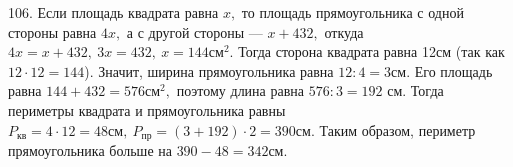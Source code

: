 106. Если площадь квадрата равна $x,$ то площадь прямоугольника с одной стороны равна $4x,$ а с другой стороны --- $x+432,$ откуда $4x=x+432,\ 3x=432,\ x=144\text{см}^2.$ Тогда сторона квадрата равна 12см (так как $12\cdot12=144$). Значит, ширина прямоугольника равна $12:4=3$см. Его площадь равна $144+432=576\text{см}^2,$ поэтому длина равна $576:3=192$ см. Тогда периметры квадрата и прямоугольника равны $P_\text{кв}=4\cdot12=48\text{см},\ P_\text{пр}=(3+192)\cdot2=390\text{см}.$ Таким образом, периметр прямоугольника больше на $390-48=342$см.\\
